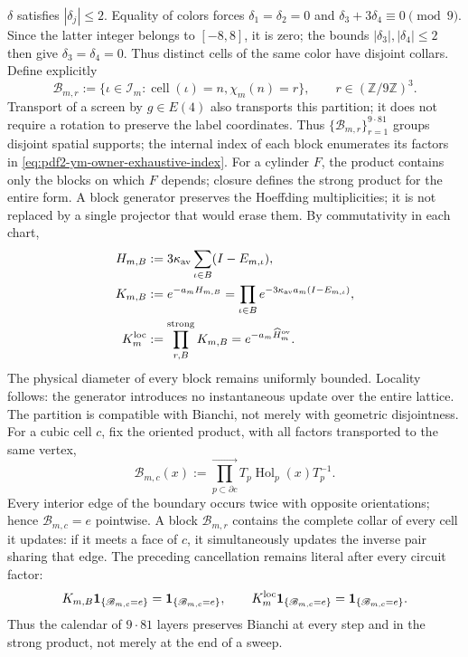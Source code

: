 $\delta$ satisfies $|\delta_j|\le2$. Equality of colors forces
$\delta_1=\delta_2=0$ and
$\delta_3+3\delta_4\equiv0\pmod9$. Since the latter integer belongs to
$[-8,8]$, it is zero; the bounds $|\delta_3|,|\delta_4|\le2$ then give
$\delta_3=\delta_4=0$. Thus distinct cells of the same color have
disjoint collars. Define explicitly
\begin{equation}\label{eq:pdf2-ym-owner-729-blocks}
 \mathcal B_{m,r}:=\{\iota\in\mathcal I_m:
   \operatorname{cell}(\iota)=n, \chi_m(n)=r\},
 \qquad r\in(\mathbb Z/9\mathbb Z)^3.
\end{equation}
Transport of a screen by $g\in E(4)$ also transports this
partition; it does not require a rotation to preserve the label coordinates.
Thus $\{\mathcal B_{m,r}\}_{r=1}^{9\cdot81}$ groups disjoint spatial
supports;
the internal index of each block enumerates its factors in
\eqref{eq:pdf2-ym-owner-exhaustive-index}. For a cylinder $F$, the product
contains only the blocks on which $F$ depends; closure defines the strong product
for the entire form. A block generator preserves the Hoeffding
multiplicities; it is not replaced by a single projector that would erase them. By
commutativity in each chart,
\begin{equation}\label{eq:pdf2-ym-owner-local-circuit}
\begin{aligned}
 H_{m,B}&:=3\kappa_{\rm av}\sum_{\iota\in B}(I-E_{m,\iota}),\\
 K_{m,B}&:=e^{-a_mH_{m,B}}
 =\prod_{\iota\in B}e^{-3\kappa_{\rm av}a_m(I-E_{m,\iota})},\\
 K_m^{\rm loc}&:=\mathop{\prod_{r,B}}^{\rm strong}K_{m,B}
 =e^{-a_m\widehat H_m^{\rm ov}}.
\end{aligned}
\end{equation}
The physical diameter of every block remains uniformly bounded. Locality follows:
the generator introduces no instantaneous update over the entire
lattice.
The partition is compatible with Bianchi, not merely with geometric disjointness. For a
cubic cell $c$, fix the oriented product, with all factors transported
to the same vertex,
\begin{equation}\label{eq:pdf2-ym-owner-bianchi-block-product}
 \mathscr B_{m,c}(x):=
 \prod_{p\subset\partial c}^{\longrightarrow}
 T_p\operatorname{Hol}_p(x)T_p^{-1}.
\end{equation}
Every interior edge of the boundary occurs twice with opposite orientations;
hence $\mathscr B_{m,c}=e$ pointwise. A block
$\mathcal B_{m,r}$ contains the complete collar of every cell it updates: if it meets
a face of $c$, it simultaneously updates the inverse pair sharing that edge.
The preceding cancellation remains literal after every circuit factor:
\begin{equation}\label{eq:pdf2-ym-owner-bianchi-block-invariance}
 K_{m,B}\mathbf1_{\{\mathscr B_{m,c}=e\}}
 =\mathbf1_{\{\mathscr B_{m,c}=e\}},
 \qquad
 K_m^{\rm loc}\mathbf1_{\{\mathscr B_{m,c}=e\}}
 =\mathbf1_{\{\mathscr B_{m,c}=e\}}.
\end{equation}
Thus the calendar of $9\cdot81$ layers preserves Bianchi at every step and in the strong
product, not merely at the end of a sweep.

